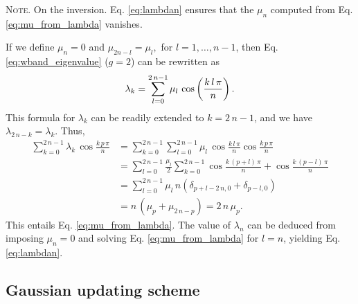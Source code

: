 \documentclass[preprint, superscriptaddress, floatfix]{revtex4-1}
\newcommand{\note}[1]{{\color{DarkGreen}\footnotesize \textsc{Note.} #1}}
\begin{document}
\note{On the inversion.
Eq. \eqref{eq:lambdan}
  ensures that the $\mu_n$
  computed from Eq. \eqref{eq:mu_from_lambda}
  vanishes.

  If we define $\mu_n = 0$ and
  $
    \mu_{ 2 n - l } = \mu_l,
  $
  for
  $l = 1, \dots, n - 1$,
  then Eq. \eqref{eq:wband_eigenvalue} ($g = 2$)
  can be rewritten as
  \begin{align}
    \lambda_k
    =
    \sum_{ l = 0 }^{ 2 \, n - 1 }
    \mu_l \, \cos \left(\frac{ k \, l \, \pi } { n } \right).
  \notag
  \end{align}
  This formula for $\lambda_k$
  can be readily extended to $k = 2 \, n - 1$,
  and we have
  $
    \lambda_{ 2 \, n - k } = \lambda_k
    .
  $
  Thus,
  \begin{align*}
    \sum_{ k = 0 }^{ 2 \, n - 1 }
      \lambda_k \,
      \cos \frac{ k \, p \, \pi }
                {      n        }
    &=
    \sum_{ k = 0 }^{ 2 \, n - 1 }
      \sum_{ l = 0 }^{ 2 \, n - 1 }
        \mu_l \,
        \cos \frac{ k \, l \, \pi }
                  {      n        }
        \cos \frac{ k \, p \, \pi }
                  {      n        }
    \\
    &=
    \sum_{ l = 0 }^{ 2 \, n - 1 }
      \frac{ \mu_l } { 2 }
      \sum_{ k = 0 }^{ 2 \, n - 1 }
        \cos \frac{ k \, (p + l) \, \pi }
                  {      n        }
                  +
        \cos \frac{ k \, (p - l) \, \pi }
                  {      n        }
    \\
    &=
    \sum_{ l = 0 }^{ 2 \, n - 1 }
      \mu_l \, n \left(
        \delta_{ p + l - 2 \, n, 0 }
        +
        \delta_{ p - l, 0 }
      \right)
    \\
    &=
    n \, \left( \mu_p + \mu_{ 2 \, n - p} \right)
    =
    2 \, n \, \mu_p.
  \end{align*}
  This entails Eq. \eqref{eq:mu_from_lambda}.
  The value of $\lambda_n$
  can be deduced from
  imposing $\mu_n = 0$
  and solving Eq. \eqref{eq:mu_from_lambda}
  for $l = n$,
  yielding Eq. \eqref{eq:lambdan}.
}






\subsection{Gaussian updating scheme}
\end{document}
